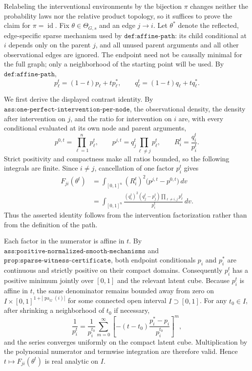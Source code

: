 Relabeling the interventional environments by the bijection \(\pi\) changes neither the probability laws nor the relative product topology, so it suffices to prove the claim for \(\pi=\operatorname{id}\). Fix \(\theta\in\Theta_{G,s}\) and an edge \(j\to i\). Let \(\theta^*\) denote the reflected, edge-specific sparse mechanism used by \(\texttt{def:affine-path}\): its child conditional at \(i\) depends only on the parent \(j\), and all unused parent arguments and all other observational edges are ignored. The endpoint need not be causally minimal for the full graph; only a neighborhood of the starting point will be used. By \(\texttt{def:affine-path}\),
\[
 p_\ell^t=(1-t)p_\ell+t p_\ell^*,
 \qquad
 q_\ell^t=(1-t)q_\ell+t q_\ell^*.
\]

We first derive the displayed contrast identity. By \(\texttt{ass:one-perfect-intervention-per-node}\), the observational density, the density after intervention on \(j\), and the ratio for intervention on \(i\) are, with every conditional evaluated at its own node and parent arguments,
\[
 p^{0,t}=\prod_{\ell=1}^n p_\ell^t,
 \qquad
 p^{j,t}=q_j^t\prod_{\ell\ne j}p_\ell^t,
 \qquad
 R_i^t=\frac{q_i^t}{p_i^t}.
\]
Strict positivity and compactness make all ratios bounded, so the following integrals are finite. Since \(i\ne j\), cancellation of one factor \(p_i^t\) gives
\[
\begin{aligned}
 F_{ji}(\theta^t)
 &=\int_{[0,1]^n}(R_i^t)^2\bigl(p^{j,t}-p^{0,t}\bigr)\,dv\\
 &=\int_{[0,1]^n}
   \frac{(q_i^t)^2(q_j^t-p_j^t)
   \prod_{\ell\ne i,j}p_\ell^t}{p_i^t}\,dv.
\end{aligned}
\]
Thus the asserted identity follows from the intervention factorization rather than from the definition of the path.

Each factor in the numerator is affine in \(t\). By \(\texttt{ass:positive-normalized-smooth-mechanisms}\) and \(\texttt{prop:sparse-witness-certificate}\), both endpoint conditionals \(p_i\) and \(p_i^*\) are continuous and strictly positive on their compact domains. Consequently \(p_i^t\) has a positive minimum jointly over \([0,1]\) and the relevant latent cube. Because \(p_i^t\) is affine in \(t\), the same denominator remains bounded away from zero on \(I\times[0,1]^{1+|\operatorname{pa}_G(i)|}\) for some connected open interval \(I\supset[0,1]\). For any \(t_0\in I\), after shrinking a neighborhood of \(t_0\) if necessary,
\[
 \frac{1}{p_i^t}
 =\frac{1}{p_i^{t_0}}
  \sum_{m=0}^{\infty}
  \left[-(t-t_0)\frac{p_i^*-p_i}{p_i^{t_0}}\right]^m,
\]
and the series converges uniformly on the compact latent cube. Multiplication by the polynomial numerator and termwise integration are therefore valid. Hence \(t\mapsto F_{ji}(\theta^t)\) is real analytic on \(I\).

